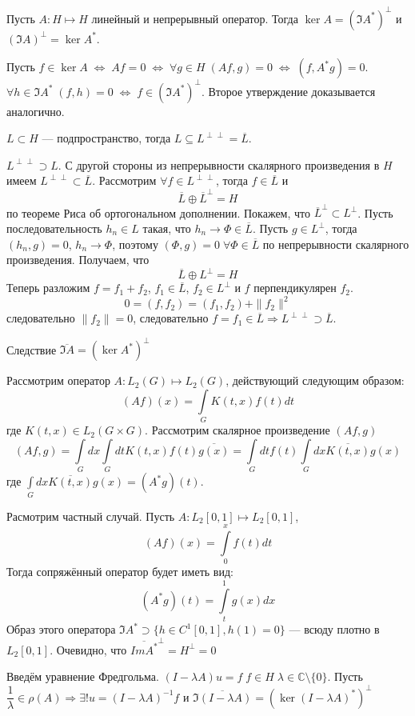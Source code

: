 \documentclass[14pt]{extarticle}
\begin{document}
\begin{Theor}[Фредгольма]
    Пусть $A : H \mapsto H$ линейный и непрерывный оператор. Тогда $\ker A = (\Im A^*)^\perp$ и $(\Im A)^\perp = \ker A^*$.
\end{Theor}
\begin{Proof}
Пусть $f \in \ker A\;\Leftrightarrow\;Af = 0\;\Leftrightarrow\;\forall g \in H\;(Af, g) = 0\;\Leftrightarrow\;(f, A^* g) = 0$.
$\forall h \in \Im A^*\;(f, h) = 0\;\Leftrightarrow\;f \in (\Im A^*)^\perp$. Второе утверждение доказывается аналогично.
\end{Proof}

\begin{Utv}
$L \subset H$ --- подпространство, тогда $L \subseteq L^{\perp\perp} = \overline{L}$.
\end{Utv}

\begin{Proof}
    $L^{\perp\perp} \supset L$.
    С другой стороны из непрерывности скалярного произведения в $H$ имеем
    $L^{\perp\perp} \subset \overline{L}$.
    Рассмотрим $\forall f \in L^{\perp\perp}$, тогда $f \in \overline{L}$ и 
    $$
    \overline{L} \oplus \overline{L}^{\perp} = H
    $$ по теореме Риса об ортогональном дополнении.
    Покажем, что $\overline{L}^{\perp} \subset L^{\perp}$.
    Пусть последовательность $h_n \in L$ такая, что $h_n \to \Phi \in \overline{L}$.
    Пусть $g \in L^{\perp}$, тогда $(h_n, g) = 0$, $h_n \to \Phi$, поэтому $(\Phi, g) = 0\;\forall \Phi \in \overline{L}$ по непрерывности скалярного произведения.
    Получаем, что
    $$
    \overline{L} \oplus L^{\perp} = H
    $$
    Теперь разложим $f = f_1 + f_2$, $f_1 \in \overline{L}$, $f_2 \in L^{\perp}$ и $f$ перпендикулярен $f_2$.
    $$
    0 = (f, f_2) = (f_1, f_2) + \|f_2\|^2
    $$
    следовательно $\|f_2\| = 0$, следовательно $f = f_1 \in \overline{L} \Rightarrow L^{\perp\perp} \supset \overline{L}$.
\end{Proof}

\begin{MathCl}{Следствие}
    $\overline{\Im A} = (\ker A^*)^\perp$
\end{MathCl}

\begin{Prim}
	Рассмотрим оператор $A : L_2(G) \mapsto L_2(G)$, действующий следующим
	образом:
	$$
	(Af)(x) = \int \limits_G K(t, x) f(t) dt
	$$
	где $K(t, x) \in L_2(G \times G)$.
	Рассмотрим скалярное произведение $(Af, g)$
	$$
	(Af, g) = \int \limits_G dx \int \limits_G dt K(t, x) f(t) \overline{g(x)}=
	\int \limits_G dt f(t) \int \limits_G dx \overline{K(t, x)} g(x)
	$$
	где $\int \limits_G dx \overline{K(t, x)} g(x) = (A^* g)(t)$.
	
	Расмотрим частный случай.
	Пусть $A:L_2[0,1] \mapsto L_2[0,1]$,
	$$
	(A f)(x) = \int \limits_0^x f(t) dt
	$$
	Тогда сопряжённый оператор будет иметь вид:
	$$
	(A^*g)(t) = \int \limits_t^1 g(x) dx
	$$
	Образ этого оператора $\Im A^* \supset \{h\in C^1[0,1], h(1) = 0\}$ --- всюду
	плотно в $L_2[0,1]$.
	Очевидно, что $\overline{Im A^*}^\perp = H^\perp = 0$
\end{Prim}

Введём уравнение Фредгольма.
$(I - \lambda A) u = f\;f\in H\;\lambda \in \mathbb C \setminus\{0\}$.
Пусть $\dfrac{1}{\lambda} \in \rho(A) \Rightarrow \exists! u = (I - \lambda A)^{-1}f$ 
и $\overline{\Im(I - \lambda A)} = (\ker(I - \lambda A)^*)^\perp$
\end{document}
